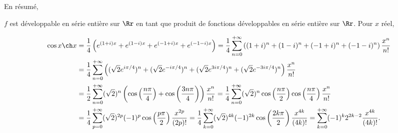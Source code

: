 {{En résumé,

\begin{center}
\fbox{
$\forall x\in]-1,1[$, $\int_{-\infty}^{x}\frac{1}{t^4+t^2+1}\;dt=\frac{\pi}{2\sqrt{3}}+\sum_{n=0}^{+\infty}\left(\frac{t^{6n+1}}{6n+1}-\frac{t^{6n+3}}{6n+3}\right)$.
}
\end{center}
$f$ est développable en série entière sur $\Rr$ en tant que produit de fonctions développables en série entière sur $\Rr$. Pour $x$ réel,

\begin{align*}\ensuremath
\cos x\ch x&=\frac{1}{4}\left(e^{(1+i)x}+e^{(1-i)x}+e^{(-1+i)x}+e^{(-1-i)x}\right)=\frac{1}{4}\sum_{n=0}^{+\infty}\left((1+i)^n+(1-i)^n+(-1+i)^n+(-1-i)^n\right)\frac{x^n}{n!}\\
 &=\frac{1}{4}\sum_{n=0}^{+\infty}\left((\sqrt{2}e^{i\pi/4})^n+(\sqrt{2}e^{-i\pi/4})^n+(\sqrt{2}e^{3i\pi/4})^n+(\sqrt{2}e^{-3i\pi/4})^n\right)\frac{x^n}{n!}\\
  &=\frac{1}{2}\sum_{n=0}^{+\infty}(\sqrt{2})^n\left(\cos\left(\frac{n\pi}{4}\right)+\cos\left(\frac{3n\pi}{4}\right)\right)\frac{x^n}{n!}
=\frac{1}{4}\sum_{n=0}^{+\infty}(\sqrt{2})^n\cos\left(\frac{n\pi}{2}\right)\cos\left(\frac{n\pi}{4}\right)\frac{x^n}{n!}\\
 &=\frac{1}{4}\sum_{p=0}^{+\infty}(\sqrt{2})^{2p}(-1)^p\cos\left(\frac{p\pi}{2}\right)\frac{x^{2p}}{(2p)!}=\frac{1}{4}\sum_{k=0}^{+\infty}(\sqrt{2})^{4k}(-1)^{2k}\cos\left(\frac{2k\pi}{2}\right)\frac{x^{4k}}{(4k)!}=\sum_{k=0}^{+\infty}(-1)^k2^{2k-2}\frac{x^{4k}}{(4k)!}.
\end{align*}

\begin{center}
\end{center}
}
}
